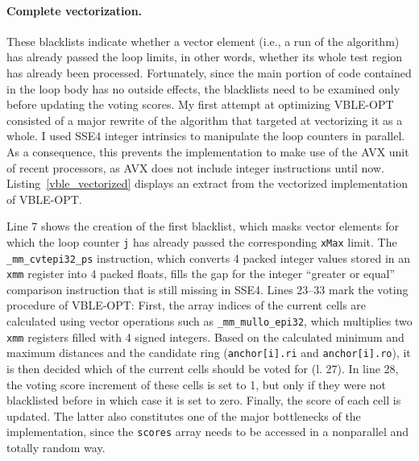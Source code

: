 \paragraph{Complete vectorization.} 
These blacklists indicate whether a vector element (i.e., a run of the algorithm) has already passed the loop limits, in other words, whether its whole test region has already been processed. Fortunately, since the main portion of code contained in the loop body has no outside effects, the blacklists need to be examined only before updating the voting scores. My first attempt at optimizing VBLE-OPT consisted of a major rewrite of the algorithm that targeted at vectorizing it as a whole. I used SSE4 integer intrinsics to manipulate the loop counters in parallel. As a consequence, this prevents the implementation to make use of the AVX unit of recent processors, as AVX does not include integer instructions until now. Listing~\ref{vble_vectorized} displays an extract from the vectorized implementation of VBLE-OPT.


Line 7 shows the creation of the first blacklist, which masks vector elements for which the loop counter \texttt{j} has already passed the corresponding \texttt{xMax} limit. The \texttt{\_mm\_cvtepi32\_ps} instruction, which converts 4 packed integer values stored in an \texttt{xmm} register into 4 packed floats, fills the gap for the integer ``greater or equal'' comparison instruction that is still missing in SSE4. Lines 23--33 mark the voting procedure of VBLE-OPT: First, the array indices of the current cells are calculated using vector operations such as \texttt{\_mm\_mullo\_epi32}, which multiplies two \texttt{xmm} registers filled with 4 signed integers. Based on the calculated minimum and maximum distances and the candidate ring (\texttt{anchor[i].ri} and \texttt{anchor[i].ro}), it is then decided which of the current cells should be voted for (l. 27). In line 28, the voting score increment of these cells is set to 1, but only if they were not blacklisted before in which case it is set to zero. Finally, the score of each cell is updated. The latter also constitutes one of the major bottlenecks of the implementation, since the \texttt{scores} array needs to be accessed in a nonparallel and totally random way.

